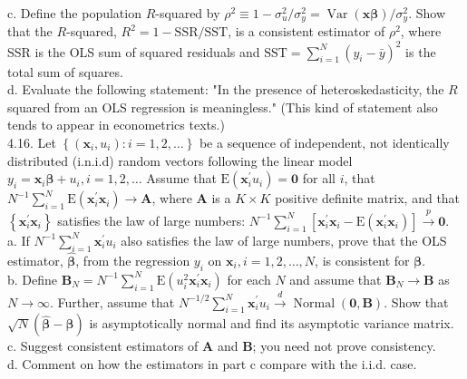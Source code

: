 \documentclass[10pt]{article}
\begin{document}
c. Define the population $R$-squared by $\rho^{2} \equiv 1-\sigma_{u}^{2} / \sigma_{y}^{2}=\operatorname{Var}(\mathbf{x} \boldsymbol{\beta}) / \sigma_{y}^{2}$. Show that the $R$-squared, $R^{2}=1-\mathrm{SSR} / \mathrm{SST}$, is a consistent estimator of $\rho^{2}$, where SSR is the OLS sum of squared residuals and $\mathrm{SST}=\sum_{i=1}^{N}\left(y_{i}-\bar{y}\right)^{2}$ is the total sum of squares.\\
d. Evaluate the following statement: "In the presence of heteroskedasticity, the $R$ squared from an OLS regression is meaningless." (This kind of statement also tends to appear in econometrics texts.)\\
4.16. Let $\left\{\left(\mathbf{x}_{i}, u_{i}\right): i=1,2, \ldots\right\}$ be a sequence of independent, not identically distributed (i.n.i.d) random vectors following the linear model $y_{i}=\mathbf{x}_{i} \boldsymbol{\beta}+u_{i}, i= 1,2, \ldots$ Assume that $\mathrm{E}\left(\mathbf{x}_{i}^{\prime} u_{i}\right)=\mathbf{0}$ for all $i$, that $N^{-1} \sum_{i=1}^{N} \mathrm{E}\left(\mathbf{x}_{i}^{\prime} \mathbf{x}_{i}\right) \rightarrow \mathbf{A}$, where $\mathbf{A}$ is a $K \times K$ positive definite matrix, and that $\left\{\mathbf{x}_{i}^{\prime} \mathbf{x}_{i}\right\}$ satisfies the law of large numbers: $N^{-1} \sum_{i=1}^{N}\left[\mathbf{x}_{i}^{\prime} \mathbf{x}_{i}-\mathrm{E}\left(\mathbf{x}_{i}^{\prime} \mathbf{x}_{i}\right)\right] \xrightarrow{p} \mathbf{0}$.\\
a. If $N^{-1} \sum_{i=1}^{N} \mathbf{x}_{i}^{\prime} u_{i}$ also satisfies the law of large numbers, prove that the OLS estimator, $\hat{\boldsymbol{\beta}}$, from the regression $y_{i}$ on $\mathbf{x}_{i}, i=1,2, \ldots, N$, is consistent for $\boldsymbol{\beta}$.\\
b. Define $\mathbf{B}_{N}=N^{-1} \sum_{i=1}^{N} \mathrm{E}\left(u_{i}^{2} \mathbf{x}_{i}^{\prime} \mathbf{x}_{i}\right)$ for each $N$ and assume that $\mathbf{B}_{N} \rightarrow \mathbf{B}$ as $N \rightarrow \infty$. Further, assume that $N^{-1 / 2} \sum_{i=1}^{N} \mathbf{x}_{i}^{\prime} u_{i} \xrightarrow{d} \operatorname{Normal}(\mathbf{0}, \mathbf{B})$. Show that $\sqrt{N}(\hat{\boldsymbol{\beta}}-\boldsymbol{\beta})$ is asymptotically normal and find its asymptotic variance matrix.\\
c. Suggest consistent estimators of $\mathbf{A}$ and $\mathbf{B}$; you need not prove consistency.\\
d. Comment on how the estimators in part c compare with the i.i.d. case.\\
\end{document}
